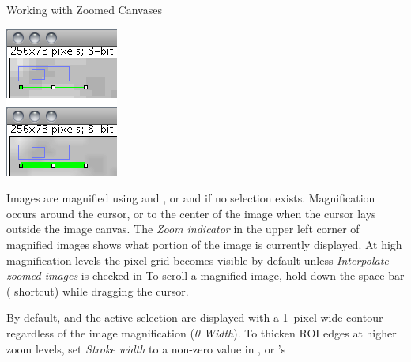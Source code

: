 \begin{infobox}
\noindent \caption{\label{infobox:ZoomedCanvas}Working with Zoomed Canvases}


\noindent %
\begin{minipage}[c][1\totalheight][t]{0.231\columnwidth}%
\includegraphics[scale=0.55]{images/ZoomIndicator}%
\end{minipage}%
\begin{minipage}[c][1\totalheight][t]{0.769\columnwidth}%
Images are magnified using \mykeystroke{$+$} and \mykeystroke{$-$},
or \mykeystroke{$\uparrow$} and \mykeystroke{$\downarrow$} if no
selection exists. Magnification occurs around the cursor, or to the
center of the image when the cursor lays outside the image canvas.
The \emph{Zoom indicator} in the upper left corner of magnified images
shows what portion of the image is currently displayed. At high magnification
levels the pixel grid becomes visible by default unless \emph{Interpolate
zoomed images} is checked in 
To scroll a magnified image, hold down the space bar (
shortcut) while dragging the cursor.%
\end{minipage}

\medskip{}


By default,  and the active selection
are displayed with a 1--pixel wide contour regardless of the image
magnification (\emph{0 Width}). To thicken ROI edges at higher zoom
levels, set \emph{Stroke width} to a non-zero value in  ,
or 's 
\end{infobox}



\subsubsection{\protect{}\label{sub:ZoomOut}}


